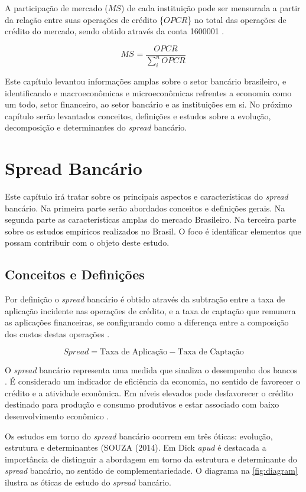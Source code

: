 \documentclass[12pt,12pt,openright,oneside,a4paper,chapter=TITLE,section=TITLE,subsection=TITLE,subsubsection=TITLE english,french,spanish,portugues,sumario=tradicional]{abntex2}
\begin{document}
A participação de mercado (\(MS\)) de cada instituição pode ser mensurada a partir da relação entre suas operações de crédito \{\(OPCR\)\} no total das operações de crédito do mercado, sendo obtido através da conta 1600001 \cite{dantas:2012}.

\[
MS_{} = \frac{OPCR_{}}{\sum_{i}^{n}OPCR_{}} 
\]

Este capítulo levantou informações amplas sobre o setor bancário brasileiro, e
identificando e macroeconômicas e microeconômicas refrentes a economia como um todo, setor financeiro, ao setor bancário e as instituições em si. No próximo capítulo serão levantados conceitos, definições e estudos sobre a evolução, decomposição e determinantes do \emph{spread} bancário.

\textual
\pagestyle{simple}

\section{Spread Bancário}

Este capítulo irá tratar sobre os principais aspectos e características do
\emph{spread} bancário. Na primeira parte serão abordados conceitos e definições
gerais. Na segunda parte as características amplas do mercado Brasileiro. Na
terceira parte sobre os estudos empíricos realizados no Brasil. O foco é
identificar elementos que possam contribuir com o objeto deste estudo.

\subsection{Conceitos e Definições}

Por definição o \emph{spread} bancário é obtido através da subtração
entre a taxa de aplicação incidente nas operações de crédito, e a taxa de
captação que remunera as aplicações financeiras, se configurando como a
diferença entre a composição dos custos destas operações \cite{BCB:2000}.

\[
Spread = \text{Taxa de Aplicação} - \text{Taxa de Captação}
\]

O \emph{spread} bancário representa uma medida que sinaliza o desempenho dos bancos
\cite{levine:1997}. É considerado um indicador de eficiência da economia, no
sentido de favorecer o crédito e a atividade econômica. Em níveis elevados pode
desfavorecer o crédito destinado para produção e consumo produtivos e estar
associado com baixo desenvolvimento econômico \cite{WB:2005}.

Os estudos em torno do \emph{spread} bancário ocorrem em três óticas: evolução,
estrutura e determinantes (SOUZA (2014). Em Dick \emph{apud} \cite{leal:2006} é
destacada a importância de distinguir a abordagem em torno da estrutura e
determinante do \emph{spread} bancário, no sentido de complementariedade. O diagrama
na \autoref{fig:diagram} ilustra as óticas de estudo do \emph{spread} bancário.
\end{document}
